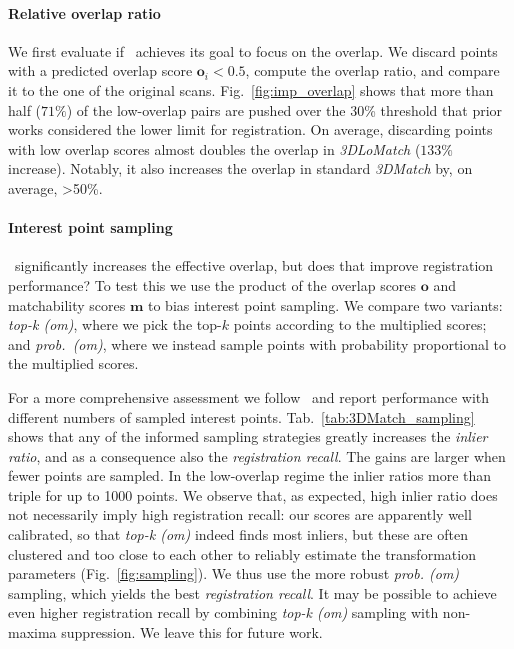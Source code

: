 \paragraph{Relative overlap ratio}
We first evaluate if \acro\ achieves its goal to focus on the overlap. We discard points with a predicted overlap score
$\mathbf{o}_i\!<\!0.5$, compute the overlap ratio, and compare it to the one of the original scans.
Fig.~\ref{fig:imp_overlap} shows that more than half ($71\%$) of the low-overlap pairs are pushed over the 30\% threshold that prior works considered the lower limit for registration. On average, discarding points with low overlap scores almost doubles the overlap in \emph{3DLoMatch} ($133\%$ increase).
Notably, it also increases the overlap in standard \emph{3DMatch} by, on average, \textgreater50\%.




\paragraph{Interest point sampling}
\acro\ significantly increases the effective overlap, but does that improve registration performance?
To test this we use the product of the overlap scores $\mathbf{o}$ and matchability scores $\mathbf{m}$ to bias interest point sampling.
We compare two variants: \emph{top-k (om)}, where we pick the top-$k$ points according to the multiplied scores;
and \emph{prob.\ (om)}, where we instead sample points with probability proportional to the multiplied scores. 

For a more comprehensive assessment we follow~\cite{bai2020d3feat} and report performance with different numbers of sampled interest points. Tab.~\ref{tab:3DMatch_sampling} shows that any of the informed sampling strategies greatly increases the \emph{inlier ratio}, and as a consequence also the \emph{registration recall}.
The gains are larger when fewer points are sampled. In the low-overlap regime the inlier ratios more than triple for up to 1000 points.
We observe that, as expected, high inlier ratio does not necessarily imply high registration recall: our scores are apparently well calibrated, so that \emph{top-k (om)} indeed finds most inliers, but these are often clustered and too close to each other to reliably estimate the transformation parameters (Fig.~\ref{fig:sampling}).
We thus use the more robust \emph{prob. (om)} sampling, which yields the best \emph{registration recall}. It may be possible to achieve even higher registration recall by combining \emph{top-k (om)} sampling with non-maxima suppression. We leave this for future work.

